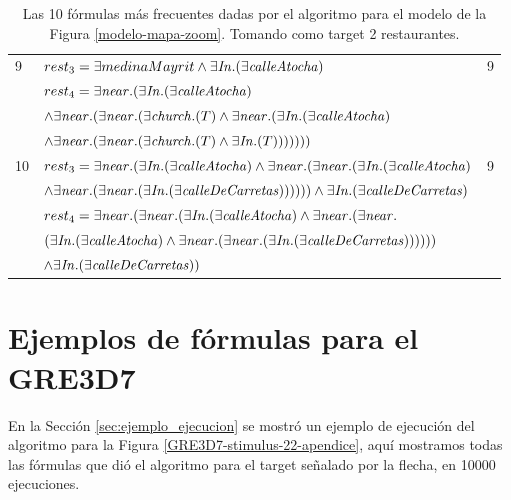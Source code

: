 \begin{table}[h]
\begin{center}
\begin{tabular}{|l|l|c|}
9&$rest_3 =\exists medinaMayrit \land \exists \mathit{In}.(\exists \mathit{calleAtocha})$ & 9\\
&$rest_4 = \exists \mathit{near}.(\exists \mathit{In}.(\exists \mathit{calleAtocha}) $ & \\
&$ \land \exists \mathit{near}.(\exists \mathit{near}.(\exists \mathit{church}.(T)  \land \exists \mathit{near}.(\exists \mathit{In}.(\exists \mathit{calleAtocha})  $ & \\
&$\land \exists \mathit{near}.(\exists \mathit{near}.(\exists \mathit{church}.(T)  \land \exists \mathit{In}.(T)))))))$&\\ \hline

10&$rest_3 = \exists \mathit{near}.(\exists \mathit{In}.(\exists \mathit{calleAtocha})  \land \exists \mathit{near}.(\exists \mathit{near}.(\exists \mathit{In}.(\exists \mathit{calleAtocha}) $ & 9\\
&$ \land \exists \mathit{near}.(\exists \mathit{near}.(\exists \mathit{In}.(\exists \mathit{calleDeCarretas}))))))  \land \exists \mathit{In}.(\exists \mathit{calleDeCarretas})  $ & \\
&$rest_4 = \exists \mathit{near}.(\exists \mathit{near}.(\exists \mathit{In}.(\exists \mathit{calleAtocha})  \land \exists \mathit{near}.(\exists \mathit{near}.$ & \\
&$(\exists \mathit{In}.(\exists \mathit{calleAtocha})  \land \exists \mathit{near}.(\exists \mathit{near}.(\exists \mathit{In}.(\exists \mathit{calleDeCarretas})))))) $ & \\
&$ \land \exists \mathit{In}.(\exists \mathit{calleDeCarretas}))$&\\ \hline

\end{tabular}

\caption{Las 10 f\'ormulas m\'as frecuentes dadas por el algoritmo para el modelo de la Figura \protect\ref{modelo-mapa-zoom}. Tomando como target 2 restaurantes.}\label{formulas-mapa-zoom2-apendice}
\end{center}
\end{table}

\section{Ejemplos de f\'ormulas para el GRE3D7}

En la Secci\'on \ref{sec:ejemplo_ejecucion} se mostr\'o un ejemplo de ejecuci\'on del algoritmo para la Figura \ref{GRE3D7-stimulus-22-apendice}, aqu\'i mostramos todas las f\'ormulas que di\'o el algoritmo para el target se\~nalado por la flecha, en 10000 ejecuciones.

